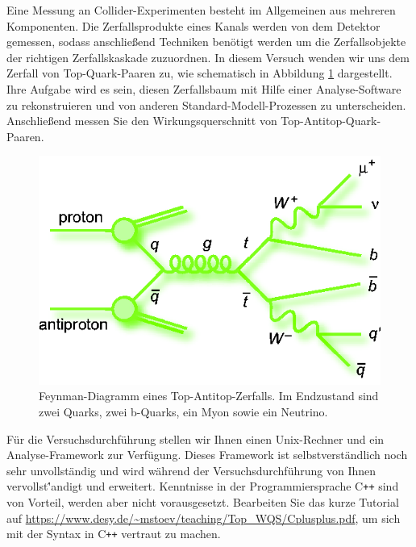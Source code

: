 	Eine Messung an Collider-Experimenten besteht im Allgemeinen aus mehreren Komponenten. Die Zerfallsprodukte eines Kanals werden von dem Detektor gemessen, sodass anschlie\ss{}end Techniken ben\"otigt werden um die Zerfallsobjekte der richtigen Zerfallskaskade zuzuordnen. In diesem Versuch wenden wir uns dem Zerfall von Top-Quark-Paaren zu, wie schematisch in Abbildung \ref{ttbarsemilep} dargestellt. Ihre Aufgabe wird es sein, diesen Zerfallsbaum mit Hilfe einer Analyse-Software zu rekonstruieren und von anderen Standard-Modell-Prozessen zu unterscheiden. Anschlie\ss{}end messen Sie den Wirkungsquerschnitt von Top-Antitop-Quark-Paaren.
\begin{figure}[h]
\centerline{\includegraphics[scale=0.5]{pics_feynman_ttbar_mujets}}
\caption{Feynman-Diagramm eines Top-Antitop-Zerfalls. Im Endzustand sind zwei Quarks, zwei b-Quarks, ein Myon sowie ein Neutrino.}
\label{ttbarsemilep}
\end{figure}

F\"ur die Versuchsdurchf\"uhrung stellen wir Ihnen einen Unix-Rechner und ein Analyse-Framework zur Verf\"ugung. Dieses Framework ist selbstverst\"andlich noch sehr
 unvollst\"andig und wird w\"ahrend der Versuchsdurchf\"uhrung von Ihnen vervollst\''andigt und erweitert. Kenntnisse in der Programmiersprache C\texttt{++} sind von Vorteil, 
werden aber nicht vorausgesetzt. Bearbeiten Sie das kurze Tutorial auf
\url{https://www.desy.de/~mstoev/teaching/Top_WQS/Cplusplus.pdf}, um sich mit der Syntax in C\texttt{++} vertraut zu machen.\\

